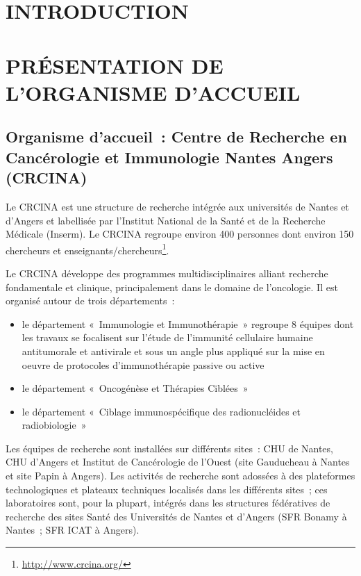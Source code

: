 \documentclass[a4paper,10pt]{article}
\begin{document}
\section{INTRODUCTION }

\section{PR\'{E}SENTATION DE L'ORGANISME D'ACCUEIL }
\subsection{Organisme d’accueil : Centre de Recherche en Cancérologie et Immunologie Nantes Angers (CRCINA)}
Le CRCINA est une structure de recherche intégrée aux universités de Nantes et d’Angers et labellisée par l’Institut National de la Santé et de la Recherche Médicale (Inserm). 
Le CRCINA regroupe environ 400 personnes dont environ 150 chercheurs et enseignants/chercheurs\footnote{\url{http://www.crcina.org/}}.

Le CRCINA développe des programmes multidisciplinaires alliant recherche fondamentale et clinique, principalement dans le domaine de l’oncologie. Il est organisé autour de trois départements :
\begin{itemize}
 \item le département « Immunologie et Immunothérapie » regroupe 8 équipes dont les travaux se focalisent sur l’étude de l’immunité cellulaire humaine antitumorale et antivirale et sous un angle plus appliqué sur la mise en oeuvre de protocoles d’immunothérapie passive ou active
\item le département « Oncogénèse et Thérapies Ciblées »
\item le département « Ciblage immunospécifique des radionucléides et radiobiologie » 
\end{itemize}
Les équipes de recherche sont installées sur différents sites : CHU de Nantes, CHU d’Angers et Institut de Cancérologie de l’Ouest (site Gauducheau à Nantes et site Papin à Angers).
Les activités de recherche sont adossées à des plateformes technologiques et plateaux techniques localisés dans les différents sites ; ces laboratoires sont, pour la plupart, intégrés dans les structures fédératives de recherche des sites Santé des Universités de Nantes et d’Angers (SFR Bonamy à Nantes ; SFR ICAT à Angers).
\end{document}
